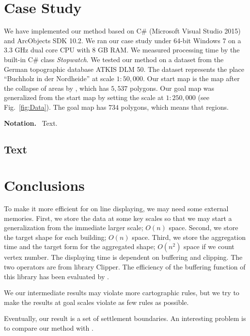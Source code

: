 \documentclass[graybox]{svmult}
\newcommand{\mypar}[1]{\bigskip\noindent\textbf{#1.}~}
\begin{document}
\section{Case Study}
\label{sec:CaseStudy}
We have implemented our method based on C\# (Microsoft Visual 
Studio 
2015) and ArcObjects SDK 10.2. 
We ran our case study under 64-bit 
Windows 7 on a 3.3 GHz dual core CPU with 8 GB RAM.
We measured processing time by the built-in C\# class 
\emph{Stopwatch}.
We tested our method on a dataset from the German topographic 
database ATKIS DLM 50. The dataset represents the place 
``Buchholz in der Nordheide'' at scale $1:50{,}000$. Our start 
map is the map after the collapse of areas by \citet[pp. 
61--66]{haunert2008f}, which has $5{,}537$ polygons. Our goal 
map was generalized from the start map by 
\citet{haunertwolff2010b} setting the scale at $1:250{,}000$ 
(see Fig.~\ref{fig:Data}). The goal map has $734$ polygons, 
which means that  regions.  



\mypar{Notation}
Text. 

\subsection{Text}
\label{sec:Formalizing}



\section{Conclusions}
\label{sec:Conclusions}


To make it more efficient for on line displaying, we may need 
some external memories. First, we store the data at some key 
scales so that we may start a generalization from the immediate 
larger scale; $O(n)$ space. Second, we store the target shape 
for each building; $O(n)$ space. Third, we store the aggregation 
time and the target form for the aggregated shape; $O(n^2)$ 
space if we count vertex number.
%
The displaying time is dependent on buffering and clipping. The 
two operators are from library Clipper. The efficiency of the 
buffering function of this library has been evaluated by 
\textcite{Palfrader2015}.


We our intermediate results may violate more cartographic rules, but we try to 
make the results at goal scales violate as few rules as possible.

Eventually, our result is a set of settlement boundaries. An interesting 
problem is to compare our method with \textcite{Chaudhry2008}.


\printbibliography
%
%
\end{document}
